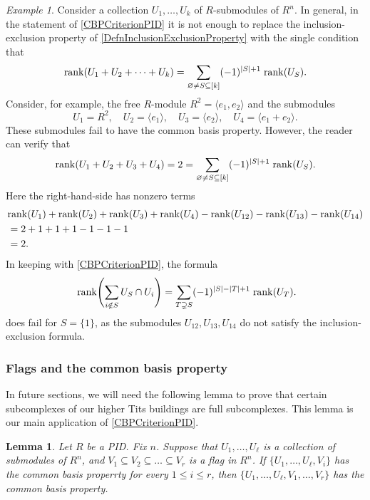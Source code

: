 \documentclass[a4paper]{amsart}
\numberwithin{theoremcounter}{section}
\newtheorem{lemma}[lemmaauto]{Lemma}
\theoremstyle{definition}
\theoremstyle{remark}
\newtheorem{example}[exampleauto]{Example}
\newcommand{\mr}[1]{{\rm #1}}
\newcommand{\rank}{\mr{rank}}
\begin{document}
\begin{example} Consider a collection $U_1, \dots, U_k$ of $R$-submodules of $R^n$. In general, in the statement of \autoref{CBPCriterionPID} it is not enough to replace the inclusion-exclusion property of \autoref{DefnInclusionExclusionProperty} with the single condition that $$ \rank(U_1 + U_2 + \dots +  U_k) = \sum_{\varnothing \neq S \subseteq [k]} (-1)^{|S|+1} \; \rank(U_S). $$ 
Consider, for example, the free $R$-module $R^2 = \langle e_1, e_2\rangle$ and the submodules 
$$ U_1 = R^2, \quad U_2 =  \langle e_1 \rangle,  \quad U_3 =  \langle e_2\rangle,  \quad U_4 =  \langle e_1 + e_2\rangle. $$ 
These submodules fail to have the common basis property. However, the reader can verify that 
$$ \rank(U_1 + U_2 + U_3 +  U_4) = 2 =  \sum_{\varnothing \neq S \subseteq [k]} (-1)^{|S|+1} \; \rank(U_S). $$ 
Here the right-hand-side has nonzero terms 
\begin{align*} 
& \rank(U_1) + \rank(U_2) + \rank(U_3) + \rank(U_4)  - \rank(U_{12}) -  \rank(U_{13}) - \rank(U_{14})  \\ 
& = 2+1+1+1-1-1-1 \\ 
&=2 .
\end{align*} 
In keeping with \autoref{CBPCriterionPID}, the formula 
$$\text{ rank$\left(\sum_{i \notin S} U_S \cap U_i \right)$} = \sum_{T\supsetneq S} (-1)^{|S|-|T| +1} \; \rank(U_T). 
$$ 
does fail for $S=\{1\}$, as the submodules $U_{12},  U_{13},  U_{14}$ do not satisfy the inclusion-exclusion formula. 
\end{example} 


\subsubsection{Flags and the common basis property} 

In future sections, we will need the following lemma to prove that certain subcomplexes of our higher Tits buildings are full subcomplexes. This lemma is our main application of \autoref{CBPCriterionPID}.  

\begin{lemma} \label{BigFlagLemma}  Let $R$ be a PID.  Fix $n$. Suppose that $U_1, \dots, U_{\ell}$ is a collection of submodules of $R^n$, and $V_1 \subseteq V_2 \subseteq \dots \subseteq V_r$ is a flag in $R^n$.  If $\{U_1, \dots, U_{\ell}, V_i\}$ has the common basis properrty for every $1 \leq i \leq r$, then 
$\{U_1, \dots, U_{\ell}, V_1, \dots, V_r\}$ has the common basis property. 
\end{lemma}   
\end{document}
